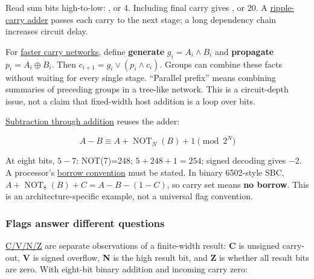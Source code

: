 Read sum bits high-to-low: , or 4. Including final carry gives , or 20. A \hyperref[appendix-17917d9fdbe3]{ripple-carry adder} passes each carry to the next stage; a long dependency chain increases circuit delay.

For \hyperref[appendix-b5c46b2d94ff]{faster carry networks}, define \textbf{generate} \(g_i=A_i\land B_i\) and \textbf{propagate} \(p_i=A_i\oplus B_i\). Then \(c_{i+1}=g_i\lor(p_i\land c_i)\). Groups can combine these facts without waiting for every single stage. ``Parallel prefix'' means combining summaries of preceding groups in a tree-like network. This is a circuit-depth issue, not a claim that fixed-width host addition is a loop over bits.

\hyperref[appendix-1c7df340573e]{Subtraction through addition} reuses the adder:

\[
A-B \equiv A+\operatorname{NOT}_N(B)+1\pmod{2^N}
\]

At eight bits, \(5-7\): NOT(7)=248; \(5+248+1=254\); signed decoding gives −2. A processor's \hyperref[appendix-d52d5f78ffd1]{borrow convention} must be stated. In binary 6502-style SBC, \(A+\operatorname{NOT}_8(B)+C=A-B-(1-C)\), so carry set means \textbf{no borrow}. This is an architecture-specific example, not a universal flag convention.

\subsubsection{Flags answer different questions}\label{01-foundations-i-ch001-flags-answer-different-questions}

\hypertarget{01-foundations-i-ch001-flags-answer-different-questions}{}

\hyperref[appendix-8d687c9c08ab]{C/V/N/Z} are separate observations of a finite-width result: \textbf{C} is unsigned carry-out, \textbf{V} is signed overflow, \textbf{N} is the high result bit, and \textbf{Z} is whether all result bits are zero. With eight-bit binary addition and incoming carry zero:

